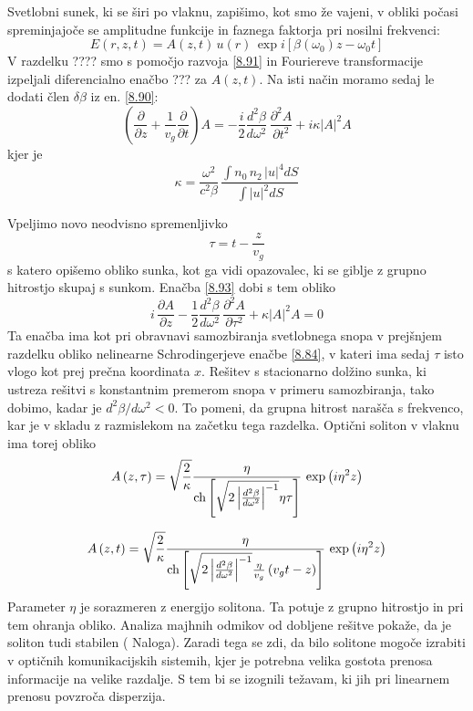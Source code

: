  Svetlobni sunek, ki se širi po vlaknu, zapišimo, kot smo že vajeni,
v obliki počasi spreminjajoče se amplitudne funkcije in faznega faktorja
pri nosilni frekvenci: 
\begin{equation}
E\left(r,z,t\right)=A\left(z,t\right)\, u\left(r\right)\,\exp i\left[\beta\left(\omega_{0}\right)z-\omega_{0}t\right]\label{8.92}
\end{equation}
 V razdelku ???? smo s pomočjo razvoja \ref{8.91} in Fouriereve transformacije
izpeljali diferencialno enačbo ??? za $A\left(z,t\right)$. Na isti
način moramo sedaj le dodati člen $\delta\beta$ iz en. \ref{8.90}:
\begin{equation}
(\frac{\partial}{\partial z}+\frac{1}{v_{g}}\frac{\partial}{\partial t})A=-\frac{i}{2}\frac{d^{2}\beta}{d\omega^{2}}\,\frac{\partial^{2}A}{\partial t^{2}}+i\kappa|A|^{2}A\label{8.93}
\end{equation}
 kjer je 
\begin{equation}
\kappa=\frac{\omega^{2}}{c^{2}\beta}\,\frac{\int n_{0}\, n_{2}\,|u|^{4}dS}{\int|u|^{2}dS}\label{8.94}
\end{equation}


Vpeljimo novo neodvisno spremenljivko 
\begin{equation}
\tau=t-\frac{z}{v_{g}}
\end{equation}
 s katero opišemo obliko sunka, kot ga vidi opazovalec, ki se giblje
z grupno hitrostjo skupaj s sunkom. Enačba \ref{8.93} dobi s tem
obliko 
\begin{equation}
i\,\frac{\partial A}{\partial z}-\frac{1}{2}\frac{d^{2}\beta}{d\omega^{2}}\,\frac{\partial^{2}A}{\partial\tau^{2}}+\kappa\left|A\right|^{2}A=0\label{8.95}
\end{equation}
 Ta enačba ima kot pri obravnavi samozbiranja svetlobnega snopa v
prejšnjem razdelku obliko nelinearne Schrodingerjeve enačbe \ref{8.84},
v kateri ima sedaj $\tau$ isto vlogo kot prej prečna koordinata $x$.
Rešitev s stacionarno dolžino sunka, ki ustreza rešitvi s konstantnim
premerom snopa v primeru samozbiranja, tako dobimo, kadar je $d^{2}\beta/d\omega^{2}<0$.
To pomeni, da grupna hitrost narašča s frekvenco, kar je v skladu
z razmislekom na začetku tega razdelka. Optični soliton v vlaknu ima
torej obliko 
\[
A\left(z,\tau\right)=\sqrt{\frac{2}{\kappa}}\frac{\eta}{{\rm ch}\left[\sqrt{2\left|\frac{d^{2}\beta}{d\omega^{2}}\right|^{-1}}\eta\tau\right]}\,\exp\left(i\eta^{2}z\right)
\]
 
\begin{equation}
A\left(z,t\right)=\sqrt{\frac{2}{\kappa}}\frac{\eta}{{\rm ch}\left[\sqrt{2\left|\frac{d^{2}\beta}{d\omega^{2}}\right|^{-1}}\frac{\eta}{v_{g}}\left(v_{g}t-z\right)\right]}\,\exp\left(i\eta^{2}z\right)\label{8.96}
\end{equation}
 Parameter $\eta$ je sorazmeren z energijo solitona. Ta potuje z
grupno hitrostjo in pri tem ohranja obliko. Analiza majhnih odmikov
od dobljene rešitve pokaže, da je soliton tudi stabilen ( Naloga).
Zaradi tega se zdi, da bilo solitone mogoče izrabiti v optičnih komunikacijskih
sistemih, kjer je potrebna velika gostota prenosa informacije na velike
razdalje. S tem bi se izognili težavam, ki jih pri linearnem prenosu
povzroča disperzija.


